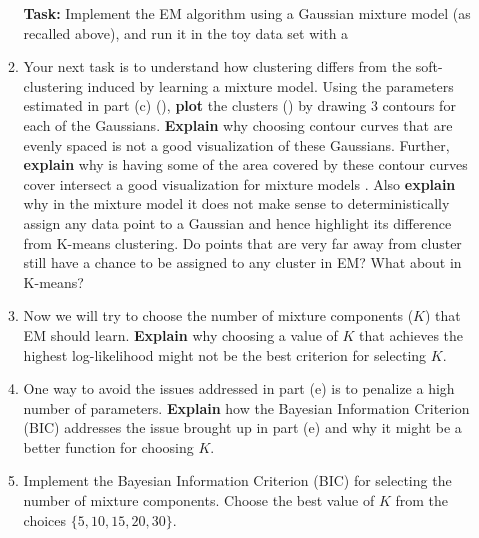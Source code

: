 \begin{enumerate}
\begin{enumerate}
    \textbf{Task:} Implement the EM algorithm using a Gaussian mixture model (as recalled above), and run it in the toy data set with a 

\item Your next task is to understand how  clustering differs from the soft-clustering induced by learning a mixture model. Using the parameters estimated in part (c) (), \textbf{plot} the clusters () by drawing 3 contours for each of the  Gaussians. \textbf{Explain} why choosing contour curves that are evenly spaced is not a good visualization of these Gaussians. Further, \textbf{explain} why is having some of the area covered by these contour curves cover intersect a good visualization for mixture models . Also \textbf{explain} why in the mixture model it does not make sense to deterministically assign any data point to a Gaussian and hence highlight its difference from K-means clustering. Do points that are very far away from cluster  still have a chance to be assigned to any cluster in EM? What about in K-means?

\item Now we will try to choose the number of mixture components ($K$) that EM should learn. \textbf{Explain} why choosing a value of $K$ that achieves the highest log-likelihood might not be the best criterion for selecting $K$.

\item One way to avoid the issues addressed in part (e) is to penalize a high number of parameters. \textbf{Explain} how the Bayesian Information Criterion (BIC) addresses the issue brought up in part (e) and why it might be a better function for choosing $K$.

\item Implement the Bayesian Information Criterion (BIC) for selecting the number of mixture components. Choose the best value of $K$ from the choices $\{ 5, 10, 15, 20 , 30\}$.


\end{enumerate}
\end{enumerate}
